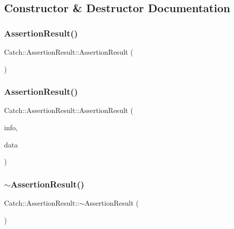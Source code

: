 \subsection{Constructor \& Destructor Documentation}
\mbox{\label{class_catch_1_1_assertion_result_a570b999c5f66e33cb31d3adb29fec25b}} 
\subsubsection{Assertion\+Result()\hspace{0.1cm}{\footnotesize\ttfamily [1/2]}}
{\footnotesize\ttfamily Catch\+::\+Assertion\+Result\+::\+Assertion\+Result (\begin{DoxyParamCaption}{ }\end{DoxyParamCaption})}

\mbox{\label{class_catch_1_1_assertion_result_ab58aeec27052ba400633ed0e36cea692}} 
\subsubsection{Assertion\+Result()\hspace{0.1cm}{\footnotesize\ttfamily [2/2]}}
{\footnotesize\ttfamily Catch\+::\+Assertion\+Result\+::\+Assertion\+Result (\begin{DoxyParamCaption}\item[{\textbf{ Assertion\+Info} const \&}]{info,  }\item[{\textbf{ Assertion\+Result\+Data} const \&}]{data }\end{DoxyParamCaption})}

\mbox{\label{class_catch_1_1_assertion_result_abf90f5abd04d38b2fb4f5d575bdc4f1e}} 
\subsubsection{$\sim$\+Assertion\+Result()}
{\footnotesize\ttfamily Catch\+::\+Assertion\+Result\+::$\sim$\+Assertion\+Result (\begin{DoxyParamCaption}{ }\end{DoxyParamCaption})}



